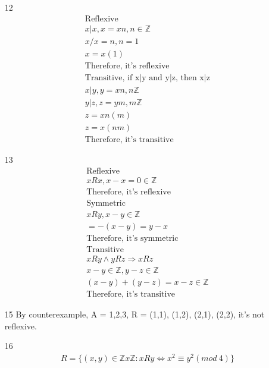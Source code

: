 \documentclass[12pt]{article}
\begin{document}
\begin{enumerate}
	\item [12]
	    \begin{equation*}
	    	\begin{split}
		    \text{Reflexive}\\
		    x|x, x=xn, n \in \mathbb{Z}\\
		    x/x = n, n = 1\\
		    x=x(1)\\
		    \text{Therefore, it's reflexive}\\
		    \text{Transitive, if x$|$y and y$|$z, then x$|$z}\\
		    x|y, y = xn, n \mathbb{Z}\\
		    y|z, z = ym, m \mathbb{Z}\\
		    z = xn(m)\\
		    z = x(nm)\\
		    \text{Therefore, it's transitive}
	    	\end{split}
	    \end{equation*}
	\item [13]
	    \begin{equation*}
	    	\begin{split}
		    \text{Reflexive}\\
		    xRx, x-x = 0 \in \mathbb{Z}\\
		    \text{Therefore, it's reflexive}\\ 
		    \text{Symmetric}\\
		    xRy, x -y\in \mathbb{Z}\\
		    = -(x-y) = y-x\\
		    \text{Therefore, it's symmetric}\\ 
		    \text{Transitive}\\
		    xRy \land yRz \Rightarrow xRz\\
		    x-y \in \mathbb{Z }, y-z \in \mathbb{Z}\\
		    (x-y) + (y-z) = x-z \in \mathbb{Z}\\
		    \text{Therefore, it's transitive}
	    	\end{split}
	    \end{equation*}
	\item [15] By counterexample, A = {1,2,3}, R = {(1,1), (1,2), (2,1), (2,2)}, it's not reflexive.
	\item [16]
	    \begin{equation*}
	    	\begin{split}
		    R = \{(x,y) \in \mathbb{Z}x\mathbb{Z} : xRy \Leftrightarrow x^2 \equiv y^2 (mod\ 4)\}\\

\end{split}
\end{equation*}
\end{enumerate}
\end{document}
